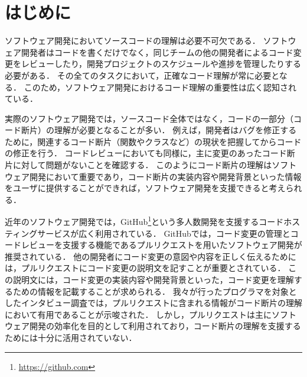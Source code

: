 \section{はじめに}

ソフトウェア開発においてソースコードの理解は必要不可欠である．
ソフトウェア開発者はコードを書くだけでなく，同じチームの他の開発者によるコード変更をレビューしたり，開発プロジェクトのスケジュールや進捗を管理したりする必要がある．
その全てのタスクにおいて，正確なコード理解が常に必要となる．
このため，ソフトウェア開発におけるコード理解の重要性は広く認知されている．





実際のソフトウェア開発では，ソースコード全体ではなく，コードの一部分（コード断片）の理解が必要となることが多い．
例えば，開発者はバグを修正するために，関連するコード断片（関数やクラスなど）の現状を把握してからコードの修正を行う．
コードレビューにおいても同様に，主に変更のあったコード断片に対して問題がないことを確認する．
このようにコード断片の理解はソフトウェア開発において重要であり，コード断片の実装内容や開発背景といった情報をユーザに提供することができれば，ソフトウェア開発を支援できると考えられる．



近年のソフトウェア開発では，GitHub\footnote{\url{https://github.com}}という多人数開発を支援するコードホスティングサービスが広く利用されている．
GitHubでは，コード変更の管理とコードレビューを支援する機能であるプルリクエストを用いたソフトウェア開発が推奨されている．
他の開発者にコード変更の意図や内容を正しく伝えるためには，プルリクエストにコード変更の説明文を記すことが重要とされている．
この説明文には，コード変更の実装内容や開発背景といった，コード変更を理解するための情報を記載することが求められる．
我々が行ったプログラマを対象としたインタビュー調査では，プルリクエストに含まれる情報がコード断片の理解において有用であることが示唆された．
しかし，プルリクエストは主にソフトウェア開発の効率化を目的として利用されており，コード断片の理解を支援するためには十分に活用されていない．

